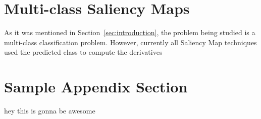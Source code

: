 \documentclass[preprint,12pt]{elsarticle}
\begin{document}
\section{Multi-class Saliency Maps}
\label{sec:multi-class saliency map}
As it was mentioned in Section~\ref{sec:introduction}, the problem being studied is a multi-class classification problem. However, currently all Saliency Map techniques used the predicted class to compute the derivatives 


 


\appendix

\section{Sample Appendix Section}
\label{sec:sample:appendix}
hey this is gonna be awesome







\end{document}
